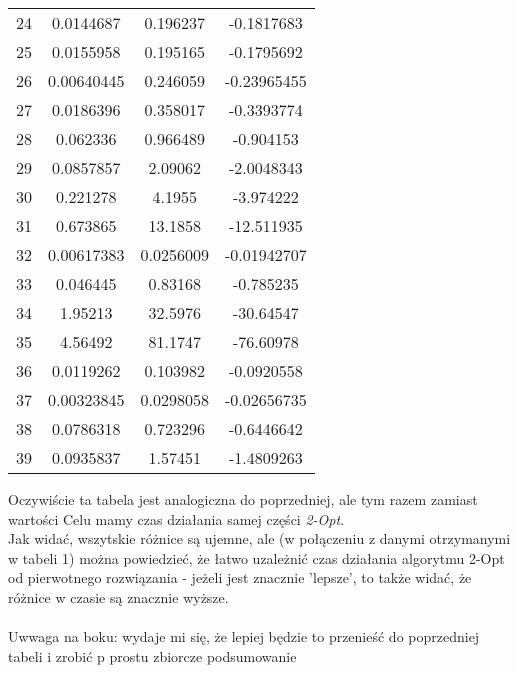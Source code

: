 \documentclass{article}
\begin{document}
\begin{table}[h!]
\begin{tabular}{c||c|c||c}
24 & 0.0144687 & 0.196237 & -0.1817683 \\
25 & 0.0155958 & 0.195165 & -0.1795692 \\
26 & 0.00640445 & 0.246059 & -0.23965455 \\
27 & 0.0186396 & 0.358017 & -0.3393774 \\
28 & 0.062336 & 0.966489 & -0.904153 \\
29 & 0.0857857 & 2.09062 & -2.0048343 \\
30 & 0.221278 & 4.1955 & -3.974222 \\
31 & 0.673865 & 13.1858 & -12.511935 \\
32 & 0.00617383 & 0.0256009 & -0.01942707 \\
33 & 0.046445 & 0.83168 & -0.785235 \\
34 & 1.95213 & 32.5976 & -30.64547 \\
35 & 4.56492 & 81.1747 & -76.60978 \\
36 & 0.0119262 & 0.103982 & -0.0920558 \\
37 & 0.00323845 & 0.0298058 & -0.02656735 \\
38 & 0.0786318 & 0.723296 & -0.6446642 \\
39 & 0.0935837 & 1.57451 & -1.4809263 \\
\end{tabular}
\end{table}

Oczywiście ta tabela jest analogiczna do poprzedniej, ale tym razem zamiast wartości Celu mamy czas działania samej części \textit{2-Opt}.\\
Jak widać, wszytskie różnice są ujemne, ale (w połączeniu z danymi otrzymanymi w tabeli 1) można powiedzieć, że łatwo uzależnić czas działania algorytmu 2-Opt od pierwotnego rozwiązania - jeżeli jest znacznie 'lepsze', to także widać, że różnice w czasie są znacznie wyższe.\\
\\
Uwwaga na boku: wydaje mi się, że lepiej będzie to przenieść do poprzedniej tabeli i zrobić p prostu zbiorcze podsumowanie

\newpage
\end{document}
